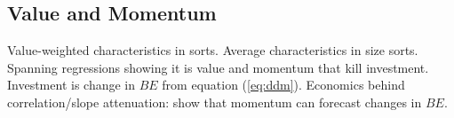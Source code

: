 
\subsection{Value and Momentum}

Value-weighted characteristics in sorts.
Average characteristics in size sorts.
Spanning regressions showing it is value and momentum that kill investment.
Investment is change in $BE$ from equation (\ref{eq:ddm}).
Economics behind correlation/slope attenuation: \textcite{asness2013devil} show that momentum 
can forecast changes in $BE$.
